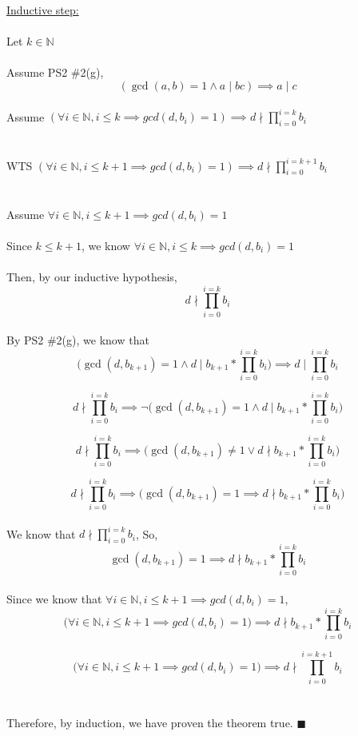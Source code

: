 \documentclass{article}
\newcommand{\N}{\mathbb{N}}
\begin{document}
\begin{enumerate}
	\underline{Inductive step:}\\\\
	Let $k\in \N $\\\\
	Assume PS2 \#2(g), $$(\gcd(a,b)=1 \wedge a\mid bc)\implies a\mid c$$\\
	Assume $(\forall i \in \N, i\leq k \implies gcd(d, b_i)=1)\implies d \nmid \displaystyle\prod_{i = 0}^{i=k} b_i$\\\\\\
	WTS $(\forall i \in \N, i\leq k+1 \implies gcd(d, b_i)=1)\implies d \nmid \displaystyle\prod_{i = 0}^{i=k+1} b_i$\\\\\\
	Assume $\forall i \in \N, i\leq k+1 \implies gcd(d, b_i)=1$\\\\
	Since $k\leq k+1$, we know $\forall i \in \N, i\leq k \implies gcd(d,b_i) = 1$\\\\
	Then, by our inductive hypothesis, $$d\nmid \displaystyle\prod_{i=0}^{i=k} b_i$$\\
	By PS2 \#2(g), we know that 
	$$\Bigg(\gcd(d,b_{k+1})=1 \wedge d\mid b_{k+1}*\displaystyle\prod_{i=0}^{i=k} b_i\Bigg)\implies d\mid  
	\displaystyle\prod_{i=0}^{i=k} b_i$$
	
	$$d\nmid \displaystyle\prod_{i=0}^{i=k} b_i \implies \neg \Bigg(\gcd(d,b_{k+1})=1 
	\wedge d\mid b_{k+1}*\displaystyle\prod_{i=0}^{i=k} b_i\Bigg)$$
	
	$$d\nmid \displaystyle\prod_{i=0}^{i=k} b_i \implies\Bigg(\gcd(d,b_{k+1}) \neq 1 \vee d\nmid b_{k+1}* 
	\displaystyle\prod_{i=0}^{i=k} b_i\Bigg)$$
	
	$$d\nmid \displaystyle\prod_{i=0}^{i=k} b_i \implies\Bigg(\gcd(d,b_{k+1}) = 1 \implies d\nmid b_{k+1}* 
	\displaystyle\prod_{i=0}^{i=k} b_i\Bigg)$$\\	
	
	We know that $d\nmid \displaystyle\prod_{i=0}^{i=k} b_i$, So,
	$$\gcd(d,b_{k+1}) = 1 \implies d\nmid b_{k+1}* 
	\displaystyle\prod_{i=0}^{i=k} b_i$$\\
	
	Since we know that $\forall i \in \N, i\leq k+1 \implies gcd(d, b_i)=1$,
	$$\Big(\forall i \in \N, i\leq k+1 \implies gcd(d, b_i)=1\Big) \implies d\nmid b_{k+1}* 
	\displaystyle\prod_{i=0}^{i=k} b_i$$
	
	$$\Big(\forall i \in \N, i\leq k+1 \implies gcd(d, b_i)=1\Big) \implies d\nmid  
	\displaystyle\prod_{i=0}^{i=k+1} b_i$$\\\\
	Therefore, by induction, we have proven the theorem true. \null\hfill $\blacksquare$\\\\
	

\end{enumerate}
\end{document}
